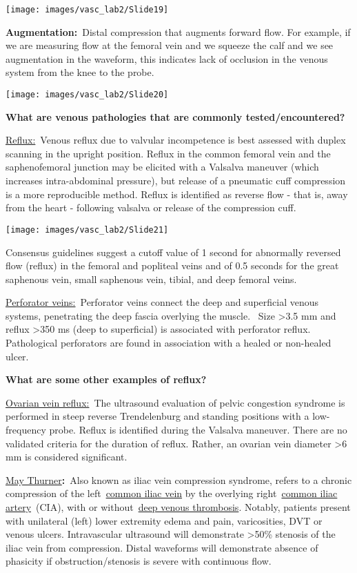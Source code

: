 \documentclass[
]{book}
\begin{document}
\texttt{[image: images/vasc\_lab2/Slide19]}

\textbf{Augmentation:}~Distal compression that augments forward flow. For
example, if we are measuring flow at the femoral vein and we squeeze the
calf and we see augmentation in the waveform, this indicates lack of
occlusion in the venous system from the knee to the probe.

\texttt{[image: images/vasc\_lab2/Slide20]}

\textbf{What are venous pathologies that are commonly tested/encountered?}

\uline{Reflux:}~Venous reflux due to valvular incompetence is best
assessed with duplex scanning in the upright position. Reflux in the
common femoral vein and the saphenofemoral junction may be elicited with
a Valsalva maneuver (which increases intra-abdominal pressure), but
release of a pneumatic cuff compression is a more reproducible method.
Reflux is identified as reverse flow - that is, away from the heart -
following valsalva or release of the compression cuff.

\texttt{[image: images/vasc\_lab2/Slide21]}

Consensus guidelines suggest a cutoff value of 1 second for abnormally
reversed flow (reflux) in the femoral and popliteal veins and of 0.5
seconds for the great saphenous vein, small saphenous vein, tibial, and
deep femoral veins.

\uline{Perforator veins:}~Perforator veins connect the deep and
superficial venous systems, penetrating the deep fascia overlying the
muscle.~ Size \textgreater3.5 mm and reflux \textgreater350 ms (deep to superficial) is
associated with perforator reflux. Pathological perforators are found in
association with a healed or non-healed ulcer.

\textbf{What are some other examples of reflux?}

\uline{Ovarian vein reflux:}~The ultrasound evaluation of pelvic
congestion syndrome is performed in steep reverse Trendelenburg and
standing positions with a low-frequency probe. Reflux is identified
during the Valsalva maneuver. There are no validated criteria for the
duration of reflux. Rather, an ovarian vein diameter \textgreater6 mm is
considered significant.

\uline{May Thurner}\textbf{:}~Also known as iliac vein compression
syndrome, refers to a chronic compression of the left~\href{https://radiopaedia.org/articles/common-iliac-vein?lang=us}{common iliac
vein} by the
overlying right~\href{https://radiopaedia.org/articles/common-iliac-artery?lang=us}{common iliac
artery}~(CIA),
with or without~\href{https://radiopaedia.org/articles/deep-vein-thrombosis?lang=us}{deep venous
thrombosis}.
Notably, patients present with unilateral (left) lower extremity edema
and pain, varicosities, DVT or venous ulcers. Intravascular ultrasound
will demonstrate \textgreater50\% stenosis of the iliac vein from compression.
Distal waveforms will demonstrate absence of phasicity if
obstruction/stenosis is severe with continuous flow.
\end{document}
